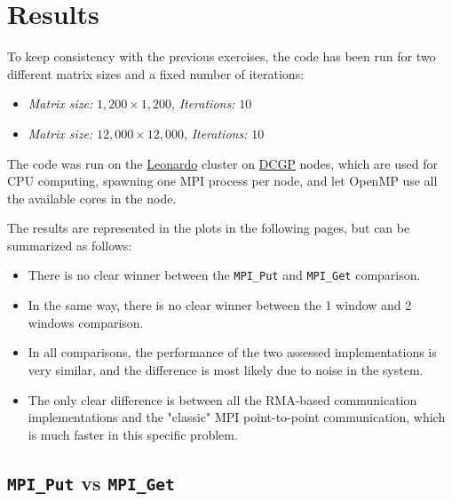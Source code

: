 \documentclass{article}
\begin{document}
    \section{Results}

    To keep consistency with the previous exercises, the code has been run for two different matrix sizes and a fixed number of iterations:

    \begin{itemize}
        \itemsep0em
        \item \textit{Matrix size:} $1,200 \times 1,200$, \textit{Iterations:} $10$
        \item \textit{Matrix size:} $12,000 \times 12,000$, \textit{Iterations:} $10$
    \end{itemize}

    The code was run on the \href{https://leonardo-supercomputer.cineca.eu/}{Leonardo} cluster on \href{https://wiki.u-gov.it/confluence/display/SCAIUS/UG3.2.2%3A+LEONARDO+DCGP+UserGuide}{DCGP} nodes, which are used for CPU computing, spawning one MPI process per node, and let OpenMP use all the available cores in the node.

    The results are represented in the plots in the following pages, but can be summarized as follows:

    \begin{itemize}
        \itemsep0em
        \item There is no clear winner between the \texttt{MPI\_Put} and \texttt{MPI\_Get} comparison.
        \item In the same way, there is no clear winner between the 1 window and 2 windows comparison.
        \item In all comparisons, the performance of the two assessed implementations is very similar, and the difference is most likely due to noise in the system.
        \item The only clear difference is between all the RMA-based communication implementations and the "classic" MPI point-to-point communication, which is much faster in this specific problem.
    \end{itemize}

    \newpage

    \subsection{\texttt{MPI\_Put} vs \texttt{MPI\_Get}}
\end{document}
